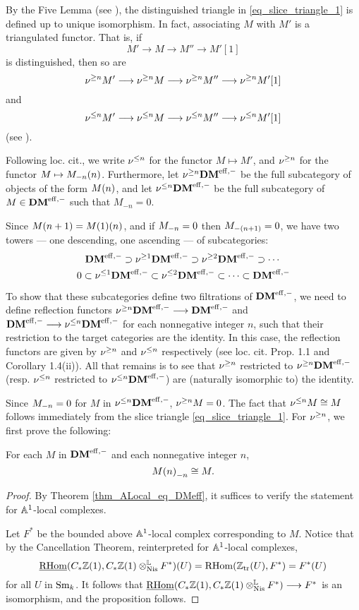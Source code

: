 By the Five Lemma (see \cite[10.2.2]{WH}), the distinguished 
triangle in \eqref{eq_slice_triangle_1} is defined up to unique 
isomorphism. In fact, associating $M$ with $M'$ is a triangulated 
functor. That is, if
\[
M' \to M \to M'' \to M'[1]
\]
is distinguished, then so are
\[
\sgDM{n}M' \to \sgDM{n}M \to \sgDM{n}M'' \to \sgDM{n}M'[1]
\]
and
\[
\slDM{n}M' \to \slDM{n}M \to \slDM{n}M'' \to \slDM{n}M'[1]
\]
(see \cite[Corollary 1.4]{HuKa}).

Following loc. cit., we write $\slDM{n}$ for the functor $M 
\mapsto M'$, and $\sgDM{n}$ for the functor $M \mapsto 
\tZ[n]{\hZ[n]{M}}$. Furthermore, let $\sgDM{n}\DMeff$ be the full
subcategory of objects of the form $\tZ[n]{M}$, and let 
$\slDM{n} \DMeff$ be the full subcategory of $M \in \DMeff$ such 
that $M_{-n} = 0$.

Since $\tZ[n + 1]{M} = \tZ[n]{\tZ[1]{M}}$, and if $\hZ[n]{M} = 0$
then $\hZ[(n + 1)]{M} = 0$, we have two towers --- one descending, one 
ascending --- of subcategories:
\begin{equation}
\DMeff \supset \sgDM{1}\DMeff \supset \sgDM{2}\DMeff \supset \cdots \\
\end{equation}
\vskip 5pt
\begin{equation}
0 \subset \slDM{1}\DMeff \subset \slDM{2}\DMeff \subset \cdots \subset
\DMeff
\end{equation}

To show that these subcategories define two filtrations of 
$\DMeff$, we need to define reflection functors $\sgDM{n}\DMeff 
\to \DMeff$ and $\DMeff \to \slDM{n}\DMeff$ for each nonnegative 
integer $n$, such that their restriction to the target categories 
are the identity. In this case, the reflection functors are given 
by $\sgDM{n}$ and $\slDM{n}$ respectively (see loc. cit. Prop. 1.1 
and Corollary 1.4(ii)). All that remains is to see that $\sgDM{n}$ 
restricted to $\sgDM{n}\DMeff$ (resp. $\slDM{n}$ restricted to 
$\slDM{n}\DMeff$) are (naturally isomorphic to) the identity.

Since $\hZ[n]{M} = 0$ for $M$ in $\slDM{n}\DMeff$, $\sgDM{n} M = 
0$. The fact that $\slDM{n} M \cong M$ follows immediately from 
the slice triangle \eqref{eq_slice_triangle_1}. For $\sgDM{n}$, we 
first prove the following:

\begin{prop}
For each $M$ in $\DMeff$ and each nonnegative integer $n$, 
\[
\hZ[n]{\tZ[n]{M}} \cong M.
\]
\end{prop}
\begin{proof}
By Theorem \ref{thm_ALocal_eq_DMeff}, it suffices to verify the
statement for $\A^1$-local complexes. 

Let $F^*$ be the bounded above $\A^1$-local complex corresponding 
to $M$. Notice that by the Cancellation Theorem, reinterpreted for
$\A^1$-local complexes,
\[
\sheaf{\rhom}(\suslC \Z(1), \suslC \Z(1) \tLNis F^*)(U) = 
\rhom(\Ztr(U), F^*) = F^*(U)
\]
for all $U$ in $\Sm$. It follows that $\sheaf{\rhom}(\suslC\Z(1),
\suslC\Z(1) \tLNis F^*) \to F^*$ is an isomorphism, and the
proposition follows.
\end{proof}

